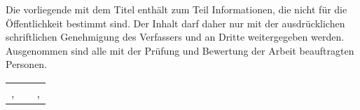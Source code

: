
\thispagestyle{empty}

\addchap{\langsperrvermerk}

\vspace*{2em}

Die vorliegende {\arbeit} mit dem Titel {\itshape{} \titel{}\/} enthält zum Teil Informationen, die nicht für die Öffentlichkeit bestimmt sind. Der Inhalt darf daher nur mit der ausdrücklichen schriftlichen Genehmigung des Verfassers und {\firma} an Dritte weitergegeben werden. \\
Ausgenommen sind alle mit der Prüfung und Bewertung der Arbeit beauftragten Personen.

\vspace{3em}

\begin{tabular}{p{}cp{}}
	\cline{1-1} \cline{3-3}
	\datumAbgabe, \autor & & \datumAbgabe, \firma 
\end{tabular}